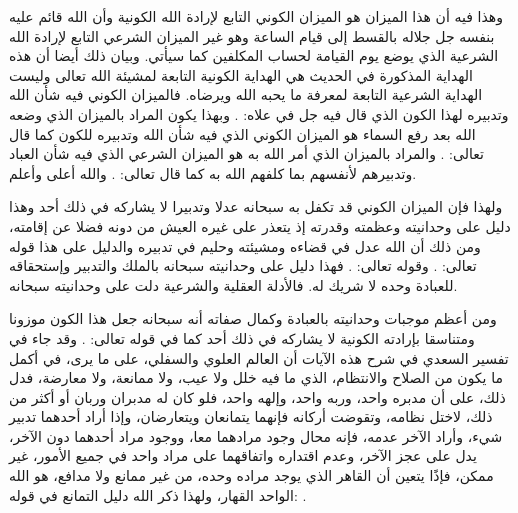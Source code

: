 وهذا فيه أن هذا الميزان هو الميزان الكوني التابع لإرادة الله الكونية وأن الله قائم عليه بنفسه جل جلاله بالقسط إلى قيام الساعة وهو غير الميزان الشرعي التابع لإرادة الله الشرعية الذي يوضع يوم القيامة لحساب المكلفين كما سيأتي. وبيان ذلك أيضا أن هذه الهداية المذكورة في الحديث هي الهداية الكونية التابعة لمشيئة الله تعالى وليست الهداية الشرعية التابعة لمعرفة ما يحبه الله ويرضاه. فالميزان الكوني فيه شأن الله وتدبيره لهذا الكون الذي قال فيه جل في علاه: \quranayah*[55][29]{\footnotesize \surahname*[55]}. وبهذا يكون المراد بالميزان الذي وضعه الله بعد رفع السماء هو الميزان الكوني الذي فيه شأن الله وتدبيره للكون كما قال تعالى: 
\quranayah*[55][7]{\footnotesize \surahname*[55]}. والمراد بالميزان الذي أمر الله به هو الميزان الشرعي الذي فيه شأن العباد وتدبيرهم لأنفسهم بما كلفهم الله به كما قال تعالى:
\quranayah*[55][8-9]{\footnotesize \surahname*[55]}. والله أعلى وأعلم.

ولهذا فإن الميزان الكوني قد تكفل به سبحانه عدلا وتدبيرا لا يشاركه في ذلك أحد وهذا دليل على وحدانيته وعظمته وقدرته إذ يتعذر على غيره العيش من دونه فضلا عن إقامته، ومن ذلك أن الله عدل في قضاءه ومشيئته وحليم في تدبيره والدليل على هذا قوله تعالى:
\quranayah*[35][41]{\footnotesize \surahname*[35]}. وقوله تعالى: \quranayah*[22][65]{\footnotesize \surahname*[22]}. فهذا دليل على وحدانيته سبحانه بالملك والتدبير وإستحقاقه للعبادة وحده لا شريك له. فالأدلة العقلية والشرعية دلت على وحدانيته سبحانه.

ومن أعظم موجبات وحدانيته بالعبادة وكمال صفاته أنه سبحانه جعل هذا الكون موزونا ومتناسقا بإرادته الكونية لا يشاركه في ذلك أحد كما في قوله تعالى: \quranayah*[21][22]{\footnotesize \surahname*[21]}. وقد جاء في تفسير السعدي في شرح هذه الآيات أن العالم العلوي والسفلي، على ما يرى، في أكمل ما يكون من الصلاح والانتظام، الذي ما فيه خلل ولا عيب، ولا ممانعة، ولا معارضة، فدل ذلك، على أن مدبره واحد، وربه واحد، وإلهه واحد، فلو كان له مدبران وربان أو أكثر من ذلك، لاختل نظامه، وتقوضت أركانه فإنهما يتمانعان ويتعارضان، وإذا أراد أحدهما تدبير شيء، وأراد الآخر عدمه، فإنه محال وجود مرادهما معا، ووجود مراد أحدهما دون الآخر، يدل على عجز الآخر، وعدم اقتداره واتفاقهما على مراد واحد في جميع الأمور، غير ممكن، فإذًا يتعين أن القاهر الذي يوجد مراده وحده، من غير ممانع ولا مدافع، هو الله الواحد القهار، ولهذا ذكر الله دليل التمانع في قوله: \quranayah*[23][91]{\footnotesize \surahname*[23]} \href{https://shamela.ws/book/42/1173#p4}{\faExternalLink} \cite{tafsir_Saadi}.

